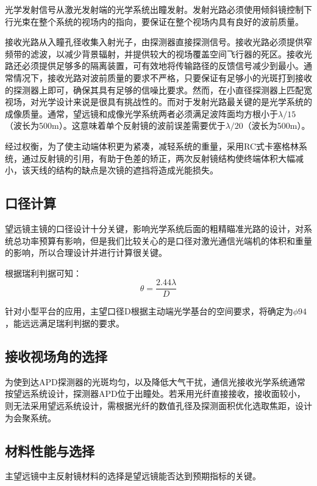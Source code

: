 光学发射信号从激光发射端的光学系统出瞳发射。发射光路必须使用倾斜镜控制下行光束在整个系统的视场内的指向，要保证在整个视场内具有良好的波前质量。

接收光路从入瞳孔径收集入射光子，由探测器直接探测信号。接收光路必须提供窄频带的滤波，以减少背景辐射，并提供较大的视场覆盖空间飞行器的死区。接收光路还必须提供足够多的隔离装置，可有效地将传输路径的反馈信号减少到最小。通常情况下，接收光路对波前质量的要求不严格，只要保证有足够小的光斑打到接收的探测器上即可，确保其具有足够的信噪比要求。然而，在小直径探测器上匹配宽视场，对光学设计来说是很具有挑战性的。而对于发射光路最关键的是光学系统的成像质量。通常，望远镜和成像光学系统两者必须满足波阵面均方根小于$\lambda /15$（波长为500m）。这意味着单个反射镜的波前误差需要优于$\lambda /20$（波长为500m）。

经过权衡，为了使主动端体积更为紧凑，减轻系统的重量，采用RC式卡塞格林系统，通过反射镜的引用，有助于色差的矫正，两次反射镜结构使终端体积大幅减小，该天线的结构的缺点是次镜的遮挡将造成光能损失。
\subsection{口径计算}
望远镜主镜的口径设计十分关键，影响光学系统后面的粗精瞄准光路的设计，对系统总功率预算有影响，但是我们比较关心的是口径对激光通信光端机的体积和重量的影响，所以合理设计并进行计算很关键。

根据瑞利判据可知：
$$\theta = \dfrac{2.44\lambda }{D}$$

针对小型平台的应用，主望口径D根据主动端光学基台的空间要求，将确定为$\phi 94$，能远远满足瑞利判据的要求。




\subsection{接收视场角的选择}

为使到达APD探测器的光斑均匀，以及降低大气干扰，通信光接收光学系统通常按望远系统设计，探测器APD位于出瞳处。若釆用光纤直接接收，接收面较小，则无法采用望远系统设计，需根据光纤的数值孔径及探测面积优化选取焦距，设计为会聚系统。
\subsection{材料性能与选择}
主望远镜中主反射镜材料的选择是望远镜能否达到预期指标的关键。

